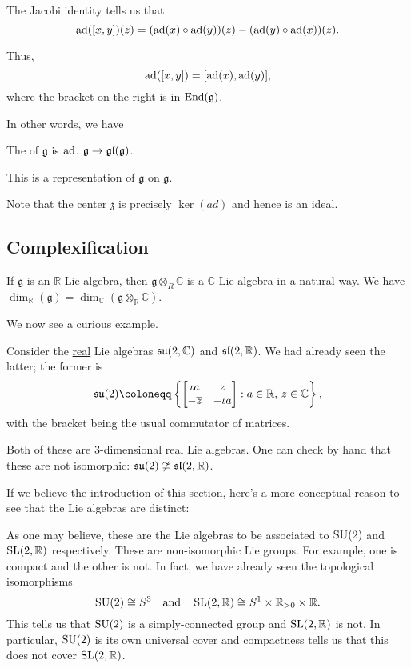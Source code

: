 \documentclass[12pt]{article}
\begin{document}
The Jacobi identity tells us that
\begin{equation*} 
	\ad([x, y])(z) = (\ad(x) \circ \ad(y))(z) - (\ad(y) \circ \ad(x))(z).
\end{equation*}

Thus,
\begin{equation*} 
	\ad([x, y]) = [\ad(x), \ad(y)],
\end{equation*}
where the bracket on the right is in $\End(\mathfrak{g})$. 

In other words, we have
\begin{defn}
	The  of $\mathfrak{g}$ is $\ad \colon \mathfrak{g} \to \gl(\mathfrak{g})$. 
\end{defn}
This is a representation of $\mathfrak{g}$ on $\mathfrak{g}$.

Note that the center $\mathfrak{z}$ is precisely $\ker(ad)$ and hence is an ideal.

\subsection{Complexification}

If $\mathfrak{g}$ is an $\mathbb{R}$-Lie algebra, then $\mathfrak{g} \otimes_{R} \mathbb{C}$ is a $\mathbb{C}$-Lie algebra in a natural way. 
We have $\dim_{\mathbb{R}}(\mathfrak{g}) = \dim_{\mathbb{C}}(\mathfrak{g} \otimes_{\mathbb{R}} \mathbb{C})$.

We now see a curious example. 

Consider the \underline{real} Lie algebras $\su(2, \mathbb{C})$ and $\sl(2, \mathbb{R})$. 
We had already seen the latter; the former is
\begin{equation*} 
	\su(2) \coloneqq \left\{\two{\iota a}{z}{-\overline{z}}{-\iota a} : a \in \mathbb{R},\, z \in \mathbb{C}\right\},
\end{equation*}
with the bracket being the usual commutator of matrices.

Both of these are $3$-dimensional real Lie algebras. One can check by hand that these are not isomorphic: $\su(2) \not\cong \sl(2, \mathbb{R})$. \newline

\begin{blockquote}
	If we believe the introduction of this section, here's a more conceptual reason to see that the Lie algebras are distinct:

	As one may believe, these are the Lie algebras to be associated to $\SU(2)$ and $\SL(2, \mathbb{R})$ respectively. 
	These are non-isomorphic Lie groups. For example, one is compact and the other is not. 
	In fact, we have already seen the topological isomorphisms
	\begin{equation*} 
		\SU(2) \cong S^{3} \andd \SL(2, \mathbb{R}) \cong S^{1} \times \mathbb{R}_{> 0} \times \mathbb{R}.
	\end{equation*}
	This tells us that $\SU(2)$ is a simply-connected group and $\SL(2, \mathbb{R})$ is not. 
	In particular, $\SU(2)$ is its own universal cover and compactness tells us that this does not cover $\SL(2, \mathbb{R})$. 
\end{blockquote}
\end{document}
